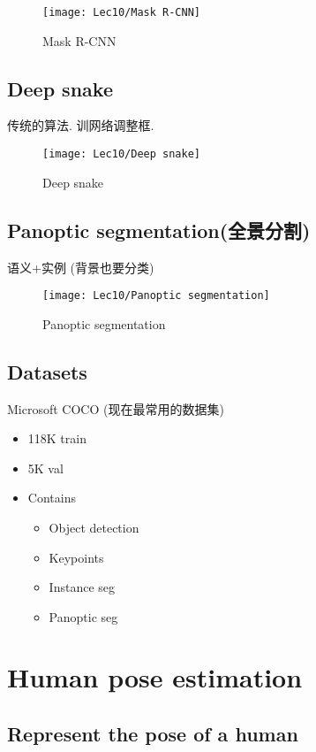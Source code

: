 \begin{figure}[H]
    \centering
    \texttt{[image: Lec10/Mask R-CNN]}
    \caption{Mask R-CNN}
\end{figure}

\subsection{Deep snake}
传统的算法. 训网络调整框. 

\begin{figure}[H]
    \centering
    \texttt{[image: Lec10/Deep snake]}
    \caption{Deep snake}
\end{figure}

\subsection{Panoptic segmentation(全景分割)}
语义+实例 (背景也要分类)

\begin{figure}[H]
    \centering
    \texttt{[image: Lec10/Panoptic segmentation]}
    \caption{Panoptic segmentation}
\end{figure}


\subsection{Datasets}
Microsoft COCO (现在最常用的数据集)
\begin{itemize}
    \item 118K train
    \item 5K val
    \item Contains
    \begin{itemize}
        \item Object detection
        \item Keypoints
        \item Instance seg
        \item Panoptic seg
    \end{itemize}
\end{itemize}

\section{Human pose estimation}

\subsection{Represent the pose of a human}


